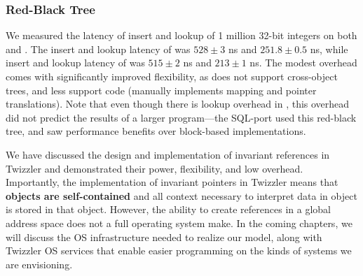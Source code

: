 \subsubsection{Red-Black Tree} We measured the latency of insert and lookup of 1 million 32-bit
integers on both \unixrbt and \nvrbt. The insert and lookup latency of \nvrbt was $528 \pm 3$ ns
and $251.8 \pm 0.5$ ns, while insert and lookup latency of \unixrbt was $515 \pm 2$ ns
and $213 \pm 1$ ns.
The modest overhead comes with significantly improved flexibility, as \unixrbt does not support
cross-object trees, and less support code (\unixrbt manually implements mapping and pointer
translations). Note that even though there is lookup overhead in
\nvrbt, this overhead did not predict the results of a larger program---the SQL-\Twizzler port used
this red-black tree, and saw performance benefits over block-based implementations.


\begin{chconc}
    We have discussed the design and implementation of invariant references in Twizzler and demonstrated their power,
    flexibility, and low overhead. Importantly, the implementation of invariant pointers in Twizzler means that
    \textbf{objects are self-contained} and all context necessary to interpret data in object is stored in that object.
    However, the ability to create references in
    a global address space does not a full operating system make. In the coming chapters, we will discuss the OS infrastructure needed to realize our model, along with Twizzler OS services that
    enable easier programming on the kinds of systems we are envisioning.
\end{chconc}